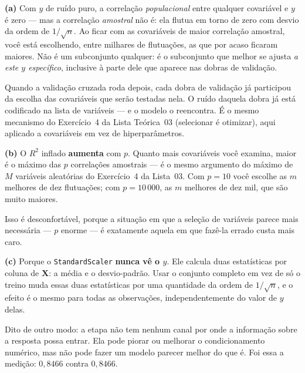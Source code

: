 \documentclass[11pt,a4paper]{article}
\begin{document}
\begin{solucao}
\textbf{(a)} Com $y$ de ruído puro, a correlação \emph{populacional} entre
qualquer covariável e $y$ é zero --- mas a correlação \emph{amostral} não é: ela
flutua em torno de zero com desvio da ordem de $1/\sqrt n$. Ao ficar com as
covariáveis de maior correlação amostral, você está escolhendo, entre milhares de
flutuações, as que por acaso ficaram maiores. Não é um subconjunto qualquer: é o
subconjunto que melhor se ajusta \emph{a este $y$ específico}, inclusive à parte
dele que aparece nas dobras de validação.

Quando a validação cruzada roda depois, cada dobra de validação já participou da
escolha das covariáveis que serão testadas nela. O ruído daquela dobra já está
codificado na lista de variáveis --- e o modelo o reencontra. É o mesmo mecanismo
do Exercício~4 da Lista Teórica~03 (selecionar é otimizar), aqui aplicado a
covariáveis em vez de hiperparâmetros.

\smallskip
\textbf{(b)} O $R^2$ inflado \textbf{aumenta} com $p$. Quanto mais covariáveis
você examina, maior é o máximo das $p$ correlações amostrais --- é o mesmo
argumento do máximo de $M$ variáveis aleatórias do Exercício~4 da Lista~03. Com
$p=10$ você escolhe as $m$ melhores de dez flutuações; com $p=10\,000$, as $m$
melhores de dez mil, que são muito maiores.

Isso é desconfortável, porque a situação em que a seleção de variáveis parece
mais necessária --- $p$ enorme --- é exatamente aquela em que fazê-la errado
custa mais caro.

\smallskip
\textbf{(c)} Porque o \texttt{StandardScaler} \textbf{nunca vê o $y$}. Ele
calcula duas estatísticas por coluna de $\bm X$: a média e o desvio-padrão. Usar
o conjunto completo em vez de só o treino muda essas duas estatísticas por uma
quantidade da ordem de $1/\sqrt n$, e o efeito é o mesmo para todas as
observações, independentemente do valor de $y$ delas.

Dito de outro modo: a etapa não tem nenhum canal por onde a informação sobre a
resposta possa entrar. Ela pode piorar ou melhorar o condicionamento numérico,
mas não pode fazer um modelo parecer melhor do que é. Foi essa a medição:
$0{,}8466$ contra $0{,}8466$.


\end{solucao}
\end{document}
